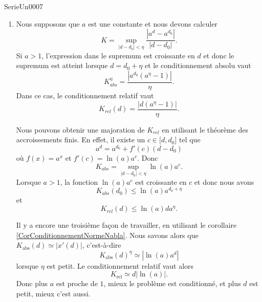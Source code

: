 
\begin{corrige}{SerieUn0007}

	\begin{enumerate}

		\item
			Nous supposons que $a$ est une constante et nous devons calculer
			\begin{equation}
				K=\sup_{| d-d_0 |<\eta}\frac{ | a^d-a^{d_0} | }{ | d-d_0 | }.
			\end{equation}
			Si $a>1$, l'expression dans le supremum est croissante en \( d\) et donc le supremum est atteint lorsque $d=d_0+\eta$ et le conditionnement absolu vaut
			\begin{equation}
				K_{abs}^{\eta}=\frac{ |a^{d_0}(a^{\eta}-1)| }{ \eta }.
			\end{equation}
			Dans ce cas, le conditionnement relatif vaut
			\begin{equation}
				K_{rel}(d)=\frac{ |d(a^{\eta}-1)| }{ \eta }.
			\end{equation}

			Nous pouvons obtenir une majoration de $K_{rel}$ en utilisant le théorème des accroissements finis. En effet, il existe un $c\in\mathopen[ d , d_0 \mathclose]$ tel que
			\begin{equation}
				a^d=a^{d_0}+f'(c)(d-d_0)
			\end{equation}
			où $f(x)=a^x$ et $f'(c)=\ln(a)a^c$. Donc
			\begin{equation}
				K_{abs}=\sup_{| d-d_0 |<\eta}\ln(a)a^c.
			\end{equation}
			Lorsque $a>1$, la fonction $\ln(a)a^c$ est croissante en $c$ et donc nous avons
			\begin{equation}
				K_{abs}(d_0)\leq \ln(a)a^{d_0+\eta}
			\end{equation}
			et
			\begin{equation}
				K_{rel}(d)\leq \ln(a)da^{\eta}.
			\end{equation}

			Il y a encore une troisième façon de travailler, en utilisant le corollaire \ref{CorConditionnementNormeNabla}. Nous savons alors que $K_{\text{abs}}(d)\simeq| x'(d) |$, c'est-à-dire
			\begin{equation}
				K_{\text{abs}}(d)^{\eta}\simeq| \ln(a)a^d |
			\end{equation}
			lorsque $\eta$ est petit. Le conditionnement relatif vaut alors
			\begin{equation}
				K_{\text{rel}}\simeq d| \ln(a) |.
			\end{equation}
			Donc plus $a$ est proche de $1$, mieux le problème est conditionné, et plus $d$ est petit, mieux c'est aussi.


\end{enumerate}
\end{corrige}
